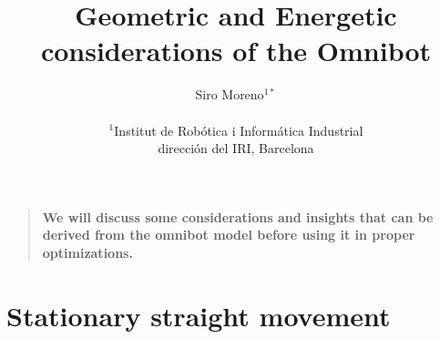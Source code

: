 \documentclass[12pt]{article}
\title{Geometric and Energetic considerations of the Omnibot}
\author
{Siro Moreno$^{1\ast}$ \\
\\
\normalsize{$^{1}$Institut de Robótica i Informática Industrial}\\
\normalsize{dirección del IRI, Barcelona}\\
}
\date{}
\newenvironment{sciabstract}{%
\begin{quote} \bf}
{\end{quote}}
\begin{document}
 


\baselineskip24pt


\maketitle 




\begin{sciabstract}
  We will discuss some considerations and insights that can be derived from the omnibot model before using it in proper optimizations.
\end{sciabstract}




\section*{Stationary straight movement}
\end{document}

